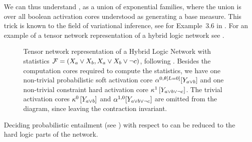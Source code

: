 
We can thus understand \HybridLogicNetworks{}, as a union of exponential families, where the union is over all boolean activation cores understood as generating a base measure.
This trick is known to the field of variational inference, see for Example~3.6 in \cite{wainwright_graphical_2008}.
For an example of a tensor network representation of a hybrid logic network see .






\begin{figure}[h]
    \begin{center}
        
    \end{center}
    \caption{Tensor network representation of a Hybrid Logic Network with statistics $\mathcal{F}=(X_{a}\lor X_{b},X_{a}\lor X_{b}\lor \lnot c)$, following .
    Besides the computation cores required to compute the statistics, we have one non-trivial \textcolor{\probcolor}{probabilistic soft activation core $\alpha^{0,\theta\left[L=0\right]}[Y_{a\lor b}]$} and one non-trivial \textcolor{\concolor}{constraint hard activation core $\kappa^{1}\left[Y_{a\lor b \lor \lnot c}\right]$}.
    The trivial activation cores $\kappa^{0}\left[Y_{a\lor b}\right]$ and $\alpha^{1,0}[Y_{a\lor b \lor \lnot c}]$ are omitted from the diagram, since leaving the contraction invariant.}
    \label{fig:ActivatedHeads}
\end{figure}




Deciding probabilistic entailment (see ) with respect to \HybridLogicNetworks{} can be reduced to the hard logic parts of the network.

